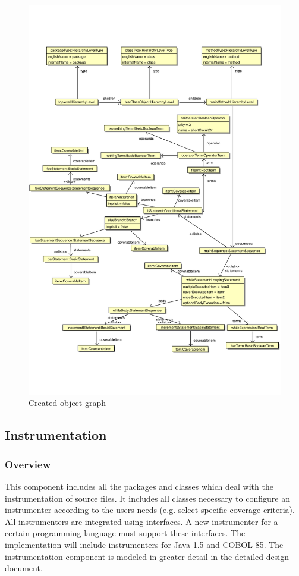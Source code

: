 \begin{figure}[hbtp]
 \centering
 \includegraphics[width=\textwidth]{images/Model/example.pdf}
 \caption{Created object graph}
 \label{figure:Overview:ast_example}
\end{figure}

\clearpage
\subsection{Instrumentation}
\subsubsection{Overview}
This component includes all the packages and classes which deal with the instrumentation of source files. It includes all classes necessary to configure an instrumenter according to the users needs (e.g. select specific coverage criteria). All instrumenters are integrated using interfaces. A new instrumenter for a certain programming language must support these interfaces. The implementation will include instrumenters for Java 1.5 and COBOL-85.
The instrumentation component is modeled in greater detail in the detailed
design document.

